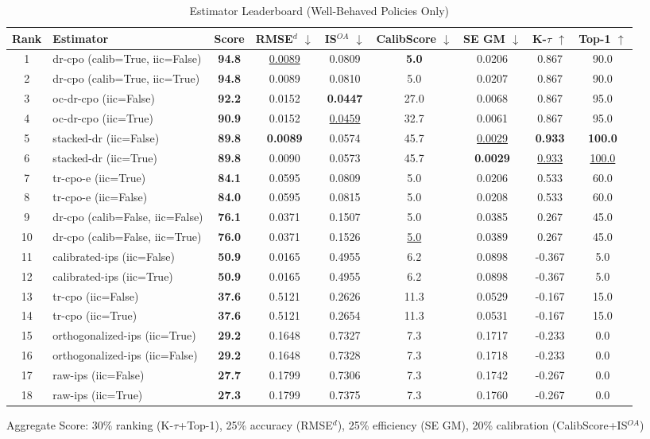 \begin{table}[htbp]
\centering
\caption{Estimator Leaderboard (Well-Behaved Policies Only)}
\label{tab:leaderboard}
\begin{tabular}{cl|c|cccccc}
\toprule
Rank & Estimator & Score & RMSE$^d$ $\downarrow$ & IS$^{OA}$ $\downarrow$ & CalibScore $\downarrow$ & SE GM $\downarrow$ & K-$\tau$ $\uparrow$ & Top-1 $\uparrow$ \\
\midrule
1 & dr-cpo (calib=True, iic=False) & \textbf{94.8} & \underline{0.0089} & 0.0809 & \textbf{5.0} & 0.0206 & 0.867 & 90.0 \\
2 & dr-cpo (calib=True, iic=True) & \textbf{94.8} & 0.0089 & 0.0810 & 5.0 & 0.0207 & 0.867 & 90.0 \\
3 & oc-dr-cpo (iic=False) & \textbf{92.2} & 0.0152 & \textbf{0.0447} & 27.0 & 0.0068 & 0.867 & 95.0 \\
4 & oc-dr-cpo (iic=True) & \textbf{90.9} & 0.0152 & \underline{0.0459} & 32.7 & 0.0061 & 0.867 & 95.0 \\
5 & stacked-dr (iic=False) & \textbf{89.8} & \textbf{0.0089} & 0.0574 & 45.7 & \underline{0.0029} & \textbf{0.933} & \textbf{100.0} \\
6 & stacked-dr (iic=True) & \textbf{89.8} & 0.0090 & 0.0573 & 45.7 & \textbf{0.0029} & \underline{0.933} & \underline{100.0} \\
7 & tr-cpo-e (iic=True) & \textbf{84.1} & 0.0595 & 0.0809 & 5.0 & 0.0206 & 0.533 & 60.0 \\
8 & tr-cpo-e (iic=False) & \textbf{84.0} & 0.0595 & 0.0815 & 5.0 & 0.0208 & 0.533 & 60.0 \\
9 & dr-cpo (calib=False, iic=False) & \textbf{76.1} & 0.0371 & 0.1507 & 5.0 & 0.0385 & 0.267 & 45.0 \\
10 & dr-cpo (calib=False, iic=True) & \textbf{76.0} & 0.0371 & 0.1526 & \underline{5.0} & 0.0389 & 0.267 & 45.0 \\
11 & calibrated-ips (iic=False) & \textbf{50.9} & 0.0165 & 0.4955 & 6.2 & 0.0898 & -0.367 & 5.0 \\
12 & calibrated-ips (iic=True) & \textbf{50.9} & 0.0165 & 0.4955 & 6.2 & 0.0898 & -0.367 & 5.0 \\
13 & tr-cpo (iic=False) & \textbf{37.6} & 0.5121 & 0.2626 & 11.3 & 0.0529 & -0.167 & 15.0 \\
14 & tr-cpo (iic=True) & \textbf{37.6} & 0.5121 & 0.2654 & 11.3 & 0.0531 & -0.167 & 15.0 \\
15 & orthogonalized-ips (iic=True) & \textbf{29.2} & 0.1648 & 0.7327 & 7.3 & 0.1717 & -0.233 & 0.0 \\
16 & orthogonalized-ips (iic=False) & \textbf{29.2} & 0.1648 & 0.7328 & 7.3 & 0.1718 & -0.233 & 0.0 \\
17 & raw-ips (iic=False) & \textbf{27.7} & 0.1799 & 0.7306 & 7.3 & 0.1742 & -0.267 & 0.0 \\
18 & raw-ips (iic=True) & \textbf{27.3} & 0.1799 & 0.7375 & 7.3 & 0.1760 & -0.267 & 0.0 \\
\bottomrule
\end{tabular}
\footnotesize{Aggregate Score: 30\% ranking (K-$\tau$+Top-1), 25\% accuracy (RMSE$^d$), 25\% efficiency (SE GM), 20\% calibration (CalibScore+IS$^{OA}$)}
\end{table}